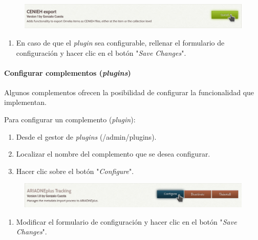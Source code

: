 \documentclass[
]{article}
\providecommand{\tightlist}{%
  \setlength{\itemsep}{0pt}\setlength{\parskip}{0pt}}
\begin{document}
\begin{figure}
\hypertarget{plugins-inst}{%
\centering
\includegraphics{../_static/images/plugins-inst.png}
\caption{}\label{plugins-inst}
}
\end{figure}

\begin{enumerate}
\def\labelenumi{\arabic{enumi}.}
\setcounter{enumi}{3}
\tightlist
\item
  En caso de que el \emph{plugin} sea configurable, rellenar el
  formulario de configuración y hacer clic en el botón "\emph{Save
  Changes}".
\end{enumerate}

\hypertarget{configurar-complementos-plugins}{%
\paragraph{\texorpdfstring{Configurar complementos
(\emph{plugins})}{Configurar complementos (plugins)}}\label{configurar-complementos-plugins}}

Algunos complementos ofrecen la posibilidad de configurar la
funcionalidad que implementan.

Para configurar un complemento (\emph{plugin}):

\begin{enumerate}
\def\labelenumi{\arabic{enumi}.}
\tightlist
\item
  Desde el gestor de \emph{plugins} ({/admin/plugins}).
\item
  Localizar el nombre del complemento que se desea configurar.
\item
  Hacer clic sobre el botón "\emph{Configure}".
\end{enumerate}

\begin{figure}
\hypertarget{plugins-conf-1}{%
\centering
\includegraphics{../_static/images/plugins-conf-1.png}
\caption{}\label{plugins-conf-1}
}
\end{figure}

\begin{enumerate}
\def\labelenumi{\arabic{enumi}.}
\setcounter{enumi}{3}
\tightlist
\item
  Modificar el formulario de configuración y hacer clic en el botón
  "\emph{Save Changes}".
\end{enumerate}
\end{document}
